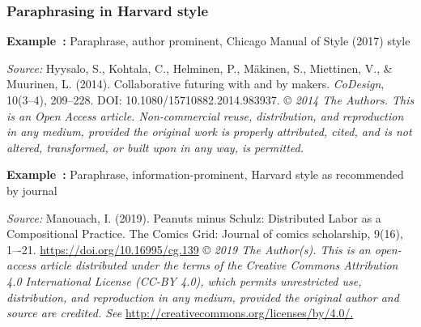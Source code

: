\documentclass[english, 12pt, a4paper, elec, utf8, a-2b, online]{aaltothesis}
\begin{document}
\subsubsection*{Paraphrasing in Harvard style}

\textsf{\textbf{Example~\theexample:}} Paraphrase, author prominent, Chicago 
Manual of Style (2017) style

\vspace{1ex}
\noindent
{}

\vspace{1ex}
\noindent
\textit{Source:} Hyysalo, S., Kohtala, C., Helminen, P., Mäkinen, S., Miettinen,
V., \& Muurinen, L. (2014). Collaborative futuring with and by makers. 
\textit{CoDesign}, 10(3--4), 209--228. DOI: 10.1080/15710882.2014.983937. 
\copyright{}
\textit{2014 The Authors. This is an Open Access article. Non-commercial reuse, 
	distribution, and reproduction in any medium, provided the original work is 
	properly attributed, cited, and is not altered, transformed, or built upon 
	in any way, is permitted.}

\vspace{1em}
\noindent
{}
\textsf{\textbf{Example~\theexample:}} Paraphrase, information-prominent, 
Harvard style as recommended by journal

\vspace{1ex}
\noindent
{}

\vspace{1ex}
\noindent
\textit{Source:} Manouach, I. (2019). Peanuts minus Schulz: Distributed Labor as
a Compositional Practice. The Comics Grid: Journal of comics scholarship, 9(16), 
1–-21. \url{https://doi.org/10.16995/cg.139} \copyright{}
\textit{2019 The Author(s). This is an open-access article distributed under the
	terms of the Creative Commons Attribution 4.0 International License (CC-BY 
	4.0), which permits unrestricted use, distribution, and reproduction in any 
	medium, provided the original author and source are credited. See}
 \url{http://creativecommons.org/licenses/by/4.0/.}
\end{document}
